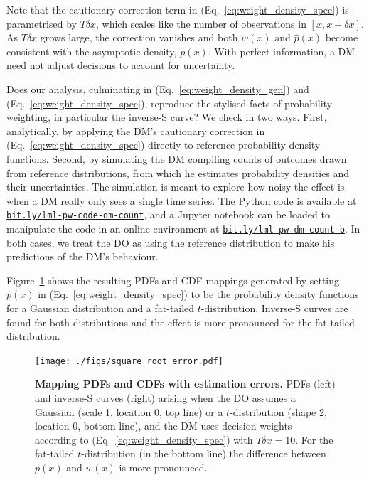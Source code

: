\documentclass[a4paper, 12pt]{article}
\newcommand{\eref}[1]{(Eq.~\ref{eq:#1})}
\newcommand{\flabel}[1]{\label{fig:#1}}
\newcommand{\Fref}[1]{Figure~\ref{fig:#1}}
\newcommand{\phat}{\hat{p}}
\begin{document}
Note that the cautionary correction term in \eref{weight_density_spec} is parametrised by $T\delta x$, which scales like the number of observations in $[x, x+\delta x]$. As $T\delta x$ grows large, the correction vanishes and both $w(x)$ and $\phat(x)$ become consistent with the asymptotic density, $p(x)$. With perfect information, a DM need not adjust decisions to account for uncertainty.

Does our analysis, culminating in \eref{weight_density_gen} and \eref{weight_density_spec}, reproduce the stylised facts of probability weighting, in particular the inverse-S curve? We check in two ways. First, analytically, by applying the DM's cautionary correction in \eref{weight_density_spec} directly to reference probability density functions. Second, by simulating the DM compiling counts of outcomes drawn from reference distributions, from which he estimates probability densities and their uncertainties. The simulation is meant to explore how noisy the effect is when a DM really only sees a single time series. The Python code is available at \href{https://bit.ly/lml-pw-code-dm-count}{\texttt{bit.ly/lml-pw-code-dm-count}}, and a Jupyter notebook can be loaded to manipulate the code in an online environment at \href{https://bit.ly/lml-pw-dm-count-b}{\texttt{bit.ly/lml-pw-dm-count-b}}. In both cases, we treat the DO as using the reference distribution to make his predictions of the DM's behaviour.

\Fref{square_root_error} shows the resulting PDFs and CDF mappings generated by setting $\phat(x)$ in \eref{weight_density_spec} to be the probability density functions for a Gaussian distribution and a fat-tailed $t$-distribution. Inverse-S curves are found for both distributions and the effect is more pronounced for the fat-tailed distribution.
\begin{figure}[!htb]
\centering
\texttt{[image: ./figs/square\_root\_error.pdf]}
\caption{\textbf{Mapping PDFs and CDFs with estimation errors.} PDFs (left) and inverse-S curves (right) arising when the DO assumes a Gaussian (scale 1, location 0, top line) or a $t$-distribution (shape 2, location 0, bottom line), and the DM uses decision weights according to \eref{weight_density_spec} with $T\delta x=10$. For the fat-tailed $t$-distribution (in the bottom line) the difference between $p(x)$ and $w(x)$ is more pronounced.}
\flabel{square_root_error}
\end{figure}
\end{document}
